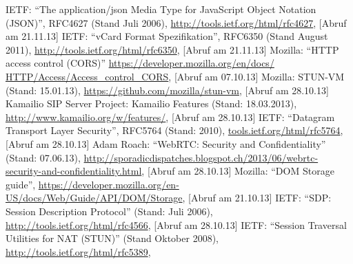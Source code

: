 




%
%


\begin{thebibliography}{literatur}
	 IETF: 
		"`The application/json Media Type for JavaScript Object Notation (JSON)"', RFC4627 (Stand Juli 2006),
		\hyperlink{http://tools.ietf.org/html/rfc4627}{http://tools.ietf.org/html/rfc4627}, 
		[Abruf am 21.11.13]
	 IETF: 
		"`vCard Format Spezifikation"', RFC6350 (Stand August 2011),
		\hyperlink{http://tools.ietf.org/html/rfc6350}{http://tools.ietf.org/html/rfc6350}, 
		[Abruf am 21.11.13]
	 Mozilla: 
		"`HTTP access control (CORS)"' 
		\hyperlink{https://developer.mozilla.org/en/docs/HTTP/Access_control_CORS}{https://developer.mozilla.org/en/docs/
		HTTP/Access/Access\_control\_CORS}, 
		[Abruf am 07.10.13]
	 Mozilla: 
		STUN-VM (Stand: 15.01.13), 
		\hyperlink{https://github.com/mozilla/stun-vm}{https://github.com/mozilla/stun-vm},
		[Abruf am 28.10.13]
	 Kamailio SIP Server Project: 
		Kamailio Features (Stand: 18.03.2013), 
		\hyperlink{http://www.kamailio.org/w/features/}{http://www.kamailio.org/w/features/}, 
		[Abruf am 28.10.13]
	 IETF: 
		"`Datagram Transport Layer Security"', RFC5764 (Stand: 2010), 
		\hyperlink{http://tools.ietf.org/html/rfc5764}{tools.ietf.org/html/rfc5764}, 
		[Abruf am 28.10.13]
	 Adam Roach: 
		"`WebRTC: Security and Confidentiality"' (Stand: 07.06.13), 
		\hyperlink{http://sporadicdispatches.blogspot.ch/2013/06/webrtc-security-and-confidentiality.html}{http://sporadicdispatches.blogspot.ch/2013/06/webrtc-security-and-confidentiality.html}, 
		[Abruf am 28.10.13]
	 Mozilla: 
		"`DOM Storage guide"',
		\hyperlink{https://developer.mozilla.org/en-US/docs/Web/Guide/API/DOM/Storage}{https://developer.mozilla.org/en-US/docs/Web/Guide/API/DOM/Storage},
		[Abruf am 21.10.13]
	 IETF:
		"`SDP: Session Description Protocol"' (Stand: Juli 2006),
		\hyperlink{http://tools.ietf.org/html/rfc4566}{http://tools.ietf.org/html/rfc4566},
		[Abruf am 28.10.13]
	 IETF:
		"`Session Traversal Utilities for NAT (STUN)"' (Stand Oktober 2008),
		\hyperlink{http://tools.ietf.org/html/rfc5389}{http://tools.ietf.org/html/rfc5389},

\end{thebibliography}
